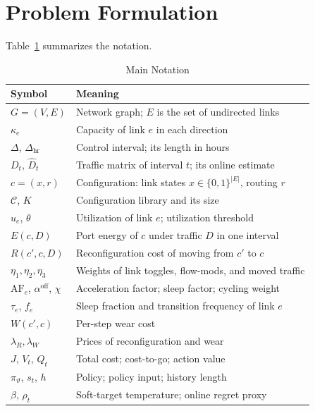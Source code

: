 \documentclass[journal]{IEEEtran}
\begin{document}
\section{Problem Formulation}\label{sec:problem}

Table~\ref{tab:notation} summarizes the notation.

\begin{table}[t]
\centering
\caption{Main Notation}
\label{tab:notation}
\footnotesize
\setlength{\tabcolsep}{3pt}
\begin{tabular}{@{}p{1.75cm}p{6.6cm}@{}}
\toprule
Symbol & Meaning \\
\midrule
$G=(V,E)$ & Network graph; $E$ is the set of undirected links \\
$\kappa_e$ & Capacity of link $e$ in each direction \\
$\Delta$, $\Delta_{\mathrm{hr}}$ & Control interval; its length in hours \\
$D_t$, $\hat{D}_t$ & Traffic matrix of interval $t$; its online estimate \\
$c=(x,r)$ & Configuration: link states $x\in\{0,1\}^{|E|}$, routing $r$ \\
$\mathcal{C}$, $K$ & Configuration library and its size \\
$u_e$, $\theta$ & Utilization of link $e$; utilization threshold \\
$E(c,D)$ & Port energy of $c$ under traffic $D$ in one interval \\
$R(c',c,D)$ & Reconfiguration cost of moving from $c'$ to $c$ \\
$\eta_1,\eta_2,\eta_3$ & Weights of link toggles, flow-mods, and moved traffic \\
$\mathrm{AF}_e$, $\alpha^{\mathrm{off}}$, $\chi$ & Acceleration factor; sleep factor; cycling weight \\
$\tau_e$, $f_e$ & Sleep fraction and transition frequency of link $e$ \\
$W(c',c)$ & Per-step wear cost \\
$\lambda_R,\lambda_W$ & Prices of reconfiguration and wear \\
$J$, $V_t$, $Q_t$ & Total cost; cost-to-go; action value \\
$\pi_\vartheta$, $s_t$, $h$ & Policy; policy input; history length \\
$\beta$, $\rho_t$ & Soft-target temperature; online regret proxy \\
\bottomrule
\end{tabular}
\end{table}
\end{document}

